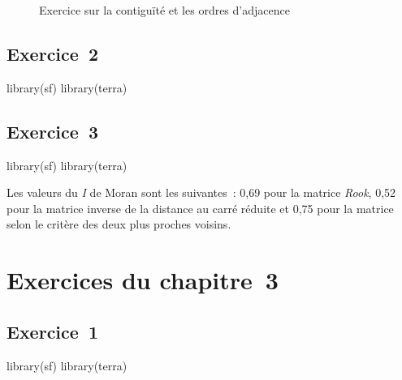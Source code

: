 \documentclass[
  letterpaper,
  DIV=11,
  numbers=noendperiod]{scrreprt}
\newenvironment{Shaded}{\begin{snugshade}}{\end{snugshade}}
\newcommand{\NormalTok}[1]{\textcolor[rgb]{0.00,0.23,0.31}{#1}}
\begin{document}
\begin{figure}


\caption{\label{fig-ExoMatriceDeContiguite}Exercice sur la contiguïté et
les ordres d'adjacence}

\end{figure}%

\subsection{Exercice~2}\label{sec-08022}

\begin{Shaded}
\begin{Highlighting}[]
\NormalTok{library(sf)}
\NormalTok{library(terra)}
\end{Highlighting}
\end{Shaded}

\subsection{Exercice~3}\label{sec-08023}

\begin{Shaded}
\begin{Highlighting}[]
\NormalTok{library(sf)}
\NormalTok{library(terra)}
\end{Highlighting}
\end{Shaded}

Les valeurs du \emph{I} de Moran sont les suivantes~: 0,69 pour la
matrice \emph{Rook}, 0,52 pour la matrice inverse de la distance au
carré réduite et 0,75 pour la matrice selon le critère des deux plus
proches voisins.

\section{Exercices du chapitre~3}\label{sec-0803}

\subsection{Exercice~1}\label{sec-08031}

\begin{Shaded}
\begin{Highlighting}[]
\NormalTok{library(sf)}
\NormalTok{library(terra)}
\end{Highlighting}
\end{Shaded}
\end{document}
